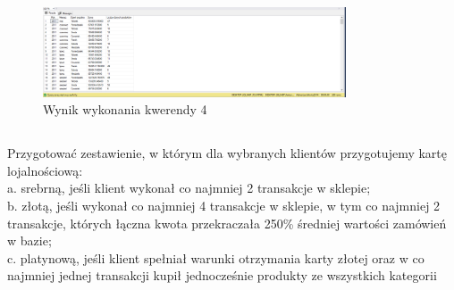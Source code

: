 \documentclass[a4paper,12pt]{article}
\begin{document}
\begin{figure}[H]
    \centering
    \includegraphics[width=0.8\textwidth]{images/04.png}
    \caption{Wynik wykonania kwerendy 4}
\end{figure}

\subsection{}

Przygotować zestawienie, w którym dla wybranych klientów przygotujemy kartę lojalnościową:\\
a. srebrną, jeśli klient wykonał co najmniej 2 transakcje w sklepie;\\
b. złotą, jeśli wykonał co najmniej 4 transakcje w sklepie, w tym co najmniej 2 transakcje, których łączna kwota przekraczała 250\% średniej wartości zamówień w bazie;\\
c. platynową, jeśli klient spełniał warunki otrzymania karty złotej oraz w co najmniej jednej transakcji kupił jednocześnie produkty ze wszystkich kategorii
\end{document}

